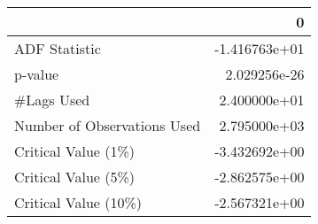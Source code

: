 \begin{tabular}{lr}
\toprule
{} &             0 \\
\midrule
ADF Statistic               & -1.416763e+01 \\
p-value                     &  2.029256e-26 \\
\#Lags Used                  &  2.400000e+01 \\
Number of Observations Used &  2.795000e+03 \\
Critical Value (1\%)         & -3.432692e+00 \\
Critical Value (5\%)         & -2.862575e+00 \\
Critical Value (10\%)        & -2.567321e+00 \\
\bottomrule
\end{tabular}

